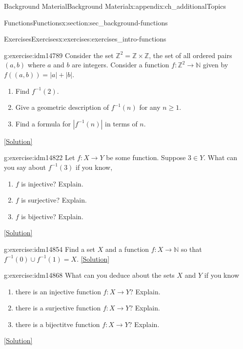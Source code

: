 \documentclass[oneside,10pt,]{book}
\numberwithin{equation}{chapter}
\def\N{\mathbb N}
\def\Z{\mathbb Z}
\def\inv{^{-1}}
\begin{document}
\begin{appendixptx}{Background Material}{}{Background Material}{}{}{x:appendix:ch_additionalTopics}
\begin{sectionptx}{Functions}{}{Functions}{}{}{x:section:sec_background-functions}
\begin{exercises-subsection}{Exercises}{}{Exercises}{}{}{x:exercises:exercises_intro-functions}
\begin{divisionexercise}{8}{}{}{g:exercise:idm14789}
Consider the set \(\Z^2 = \Z \times \Z\), the set of all ordered pairs \((a,b)\) where \(a\) and \(b\) are integers.  Consider a function \(f: \Z^2 \to \N\) given by \(f((a,b)) = |a| + |b|\).%
\begin{enumerate}[label=(\alph*)]
\item{}Find \(f\inv(2)\).%
\item{}Give a geometric description of \(f\inv(n)\) for any \(n \ge 1\).%
\item{}Find a formula for \(|f\inv(n)|\) in terms of \(n\).%
\end{enumerate}
%
\space\hspace*{0pt}\hfill{\tiny\hyperlink{g:solution:idm14810-main}{[Solution]}}\end{divisionexercise}%
\begin{divisionexercise}{9}{}{}{g:exercise:idm14822}%
Let \(f:X \to Y\) be some function. Suppose \(3 \in Y\). What can you say about \(f\inv(3)\) if you know,%
\begin{enumerate}[label=(\alph*)]
\item{}\(f\) is injective? Explain.%
\item{}\(f\) is surjective? Explain.%
\item{}\(f\) is bijective? Explain.%
\end{enumerate}
%
\space\hspace*{0pt}\hfill{\tiny\hyperlink{g:solution:idm14838-main}{[Solution]}}\end{divisionexercise}%
\begin{divisionexercise}{10}{}{}{g:exercise:idm14854}%
Find a set \(X\) and a function \(f:X \to \N\) so that \(f\inv(0) \cup f\inv(1) = X\).%
\space\hspace*{0pt}\hfill{\tiny\hyperlink{g:solution:idm14860-main}{[Solution]}}\end{divisionexercise}%
\begin{divisionexercise}{11}{}{}{g:exercise:idm14868}%
What can you deduce about the sets \(X\) and \(Y\) if you know \textellipsis{}%
\begin{enumerate}[label=(\alph*)]
\item{}there is an injective function \(f:X \to Y\)? Explain.%
\item{}there is a surjective function \(f:X \to Y\)? Explain.%
\item{}there is a bijectitve function \(f:X \to Y\)? Explain.%
\end{enumerate}
%
\space\hspace*{0pt}\hfill{\tiny\hyperlink{g:solution:idm14884-main}{[Solution]}}\end{divisionexercise}%

\end{exercises-subsection}
\end{sectionptx}
\end{appendixptx}
\end{document}
